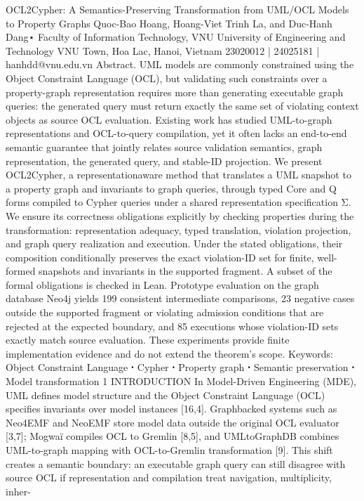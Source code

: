 OCL2Cypher: A Semantics-Preserving Transformation
from UML/OCL Models to Property Graphs
Quoc-Bao Hoang, Hoang-Viet Trinh La, and Duc-Hanh Dang⋆
Faculty of Information Technology, VNU University of Engineering and Technology
VNU Town, Hoa Lac, Hanoi, Vietnam
{23020012 | 24025181 | hanhdd}@vnu.edu.vn
Abstract. UML models are commonly constrained using the Object Constraint
Language (OCL), but validating such constraints over a property-graph representation requires more than generating executable graph queries: the generated
query must return exactly the same set of violating context objects as source
OCL evaluation. Existing work has studied UML-to-graph representations and
OCL-to-query compilation, yet it often lacks an end-to-end semantic guarantee
that jointly relates source validation semantics, graph representation, the generated query, and stable-ID projection. We present OCL2Cypher, a representationaware method that translates a UML snapshot to a property graph and invariants
to graph queries, through typed Core and Q forms compiled to Cypher queries
under a shared representation specification Σ. We ensure its correctness obligations explicitly by checking properties during the transformation: representation
adequacy, typed translation, violation projection, and graph query realization and
execution. Under the stated obligations, their composition conditionally preserves
the exact violation-ID set for finite, well-formed snapshots and invariants in the
supported fragment. A subset of the formal obligations is checked in Lean. Prototype evaluation on the graph database Neo4j yields 199 consistent intermediate
comparisons, 23 negative cases outside the supported fragment or violating admission conditions that are rejected at the expected boundary, and 85 executions
whose violation-ID sets exactly match source evaluation. These experiments provide finite implementation evidence and do not extend the theorem’s scope.
Keywords: Object Constraint Language ꞏ Cypher ꞏ Property graph ꞏ Semantic
preservation ꞏ Model transformation
1 INTRODUCTION
In Model-Driven Engineering (MDE), UML defines model structure and the Object
Constraint Language (OCL) specifies invariants over model instances [16,4]. Graphbacked systems such as Neo4EMF and NeoEMF store model data outside the original
OCL evaluator [3,7]; Mogwaï compiles OCL to Gremlin [8,5], and UMLtoGraphDB
combines UML-to-graph mapping with OCL-to-Gremlin transformation [9].
This shift creates a semantic boundary: an executable graph query can still disagree
with source OCL if representation and compilation treat navigation, multiplicity, inher-
